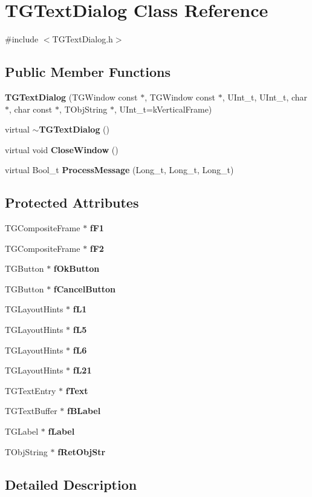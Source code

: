\section{TGTextDialog Class Reference}
\label{classTGTextDialog}


{\ttfamily \#include $<$TGTextDialog.h$>$}

\subsection*{Public Member Functions}
\begin{DoxyCompactItemize}
\item 
{\bf TGTextDialog} (TGWindow const $\ast$, TGWindow const $\ast$, UInt\_\-t, UInt\_\-t, char $\ast$, char const $\ast$, TObjString $\ast$, UInt\_\-t=kVerticalFrame)
\item 
virtual {\bf $\sim$TGTextDialog} ()
\item 
virtual void {\bf CloseWindow} ()
\item 
virtual Bool\_\-t {\bf ProcessMessage} (Long\_\-t, Long\_\-t, Long\_\-t)
\end{DoxyCompactItemize}
\subsection*{Protected Attributes}
\begin{DoxyCompactItemize}
\item 
TGCompositeFrame $\ast$ {\bf fF1}
\item 
TGCompositeFrame $\ast$ {\bf fF2}
\item 
TGButton $\ast$ {\bf fOkButton}
\item 
TGButton $\ast$ {\bf fCancelButton}
\item 
TGLayoutHints $\ast$ {\bf fL1}
\item 
TGLayoutHints $\ast$ {\bf fL5}
\item 
TGLayoutHints $\ast$ {\bf fL6}
\item 
TGLayoutHints $\ast$ {\bf fL21}
\item 
TGTextEntry $\ast$ {\bf fText}
\item 
TGTextBuffer $\ast$ {\bf fBLabel}
\item 
TGLabel $\ast$ {\bf fLabel}
\item 
TObjString $\ast$ {\bf fRetObjStr}
\end{DoxyCompactItemize}


\subsection{Detailed Description}


